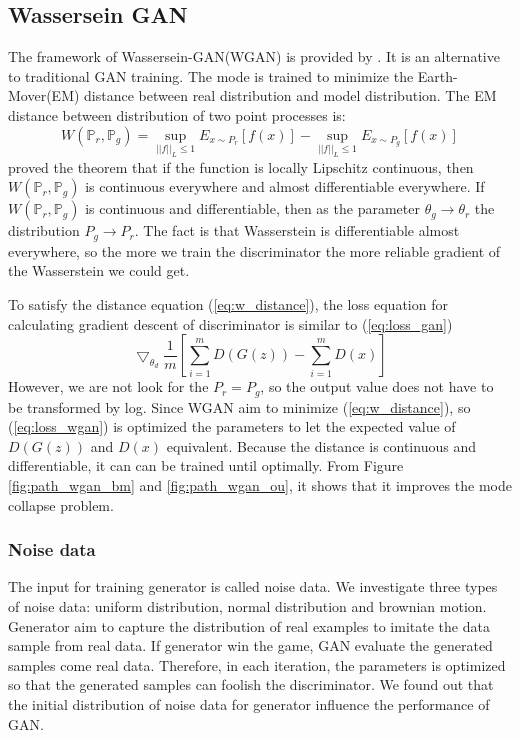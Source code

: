 \documentclass{article}
\begin{document}
	\subsection{Wassersein GAN}
	The framework of Wassersein-GAN(WGAN) is provided by \cite{arjovsky}. 
	It is an alternative to traditional GAN training.
	The mode is trained to minimize the Earth-Mover(EM) distance between real distribution and model distribution.
	The EM distance between distribution of two point processes is:
	\begin{equation}
		W(\mathbb{P}_r, \mathbb{P}_g) = \sup_{||f||_{L} \leq 1} E_{x \sim P_{r}}[f(x)] - \sup_{||f||_{L} \leq 1} E_{x \sim P_{g}}[f(x)]
		\label{eq:w_distance}
	\end{equation}
	\cite{arjovsky} proved the theorem that if the function is locally Lipschitz continuous, then $W(\mathbb{P}_r, \mathbb{P}_g)$ is continuous everywhere and almost differentiable everywhere. 
	If $W(\mathbb{P}_r, \mathbb{P}_g)$ is continuous and differentiable, then as the parameter $\theta_g \rightarrow \theta_r$ the distribution $P_g \rightarrow P_r$.
	The fact is that Wasserstein is differentiable almost everywhere, so the more we train the discriminator the more reliable gradient of the Wasserstein we could get.
	
	To satisfy the distance equation (\ref{eq:w_distance}), the loss equation for calculating gradient descent of discriminator is similar to (\ref{eq:loss_gan}) 
	\begin{equation}
	\bigtriangledown_{\theta_d} \frac{1}{m}\left[\sum_{i=1}^{m}D(G(z)) - \sum_{i=1}^{m}D(x) \right]
	\label{eq:loss_wgan}
	\end{equation}
	However, we are not look for the $P_r = P_g$, so the output value does not have to be transformed by log.
	Since WGAN aim to minimize (\ref{eq:w_distance}), so (\ref{eq:loss_wgan}) is optimized the parameters to let the expected value of $D(G(z))$ and $D(x)$ equivalent.
	Because the distance is continuous and differentiable, it can can be trained until optimally. 
	From Figure \ref{fig:path_wgan_bm} and \ref{fig:path_wgan_ou}, it shows that it improves the mode collapse problem. 
	
	\subsubsection{Noise data}
	The input for training generator is called noise data. 
	We investigate three types of noise data: uniform distribution, normal distribution and brownian motion. 
	Generator aim to capture the distribution of real examples to imitate the data sample from real data. 
	If generator win the game, GAN evaluate the generated samples come real data.
	Therefore, in each iteration, the parameters is optimized so that the generated samples can foolish the discriminator.
	We found out that the initial distribution of noise data for generator influence the performance of GAN. 
	
\end{document}
